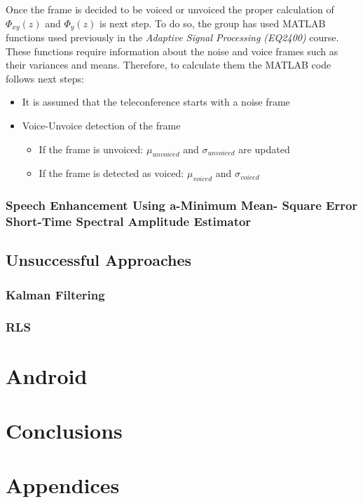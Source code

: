 \documentclass[11pt,a4paper,spanish]{book}  %
\theoremstyle{definition}  %
\theoremstyle{plain}  %
\theoremstyle{remark}  %
\begin{document}
		Once the frame is decided to be voiced or unvoiced the proper calculation of $\Phi_{xy}(z)$ and $\Phi_{y}(z)$ is next step. To do so, the group has used MATLAB functions used previously in the \textit{Adaptive Signal Processing (EQ2400)} course. These functions require information about the noise and voice frames such as their variances and means. Therefore, to calculate them the MATLAB code follows next steps:
		
		\begin{itemize}
		\item It is assumed that the teleconference starts with a noise frame
			\item Voice-Unvoice detection of the frame
		\begin{itemize}
			\item If the frame is unvoiced: $\mu_{unvoiced}$ and $\sigma_{unvoiced}$ are updated
			\item If the frame is detected as voiced: $\mu_{voiced}$ and $\sigma_{voiced}$
			\end{itemize}
		\end{itemize}
		
	
	\subsection{Speech Enhancement Using a-Minimum Mean- Square Error Short-Time Spectral Amplitude Estimator}


\section{Unsuccessful Approaches}

	\subsection{Kalman Filtering}
	
	
	\subsection{RLS}

\chapter{Android}

\chapter{Conclusions}

\chapter{Appendices}
\label{sec:appendix}







\end{document}
